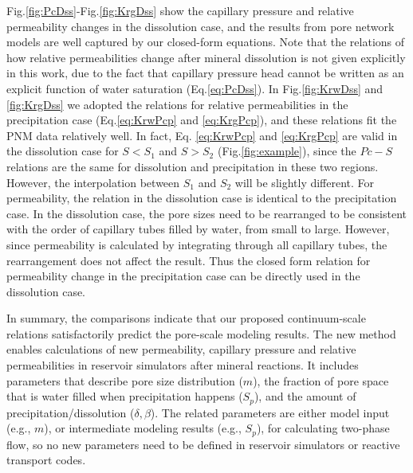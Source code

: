 \documentclass[preprint,12pt,authoryear]{elsarticle}
\begin{document}
Fig.\ref{fig:PcDss}-Fig.\ref{fig:KrgDss} show the capillary pressure and relative permeability changes in the dissolution case, and the results from pore network models are well captured by our closed-form equations. Note that the relations of how relative permeabilities change after mineral dissolution is not given explicitly in this work, due to the fact that capillary pressure head cannot be written as an explicit function of water saturation (Eq.\ref{eq:PcDss}). In Fig.\ref{fig:KrwDss} and \ref{fig:KrgDss} we adopted the relations for relative permeabilities in the precipitation case (Eq.\ref{eq:KrwPcp} and \ref{eq:KrgPcp}), and these relations fit the PNM data relatively well. In fact, Eq. \ref{eq:KrwPcp} and \ref{eq:KrgPcp} are valid in the dissolution case for $S<S_1$ and $S>S_2$ (Fig.\ref{fig:example}), since the $Pc-S$ relations are the same for dissolution and precipitation in these two regions. However, the interpolation between $S_1$ and $S_2$ will be slightly different. For permeability, the relation  in the dissolution case is identical to the precipitation case. In the dissolution case, the pore sizes need to be rearranged to be consistent with the order of capillary tubes filled by water, from small to large. However, since permeability is calculated by integrating through all capillary tubes, the rearrangement does not affect the result. Thus the closed form relation for permeability change in the precipitation case can be directly used in the dissolution case. 
 
In summary, the comparisons indicate that our proposed continuum-scale relations satisfactorily predict the pore-scale modeling results. The new method enables calculations of new permeability, capillary pressure and relative permeabilities in reservoir simulators after mineral reactions. It includes parameters that describe pore size distribution ($m$), the fraction of pore space that is water filled when precipitation happens ($S_p$), and the amount of precipitation/dissolution ($\delta,\beta$). The related parameters are either model input (e.g., $m$), or intermediate modeling results (e.g., $S_p$), for calculating two-phase flow, so no new parameters need to be defined in reservoir simulators or reactive transport codes. 
\end{document}
